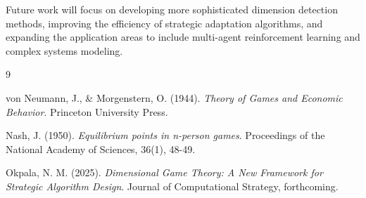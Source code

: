 \documentclass{article}
\begin{document}
Future work will focus on developing more sophisticated dimension detection methods, improving the efficiency of strategic adaptation algorithms, and expanding the application areas to include multi-agent reinforcement learning and complex systems modeling.


\begin{thebibliography}{9}

von Neumann, J., \& Morgenstern, O. (1944).
\textit{Theory of Games and Economic Behavior}.
Princeton University Press.

Nash, J. (1950).
\textit{Equilibrium points in n-person games}.
Proceedings of the National Academy of Sciences, 36(1), 48-49.

Okpala, N. M. (2025).
\textit{Dimensional Game Theory: A New Framework for Strategic Algorithm Design}.
Journal of Computational Strategy, forthcoming.

\end{thebibliography}
\end{document}

